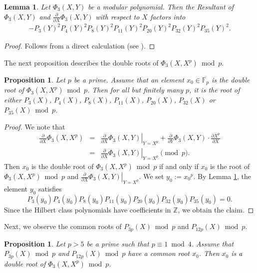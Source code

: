 \documentclass[a4paper, 11pt]{article}
\theoremstyle{plain}
\newtheorem{prop}[defn]{Proposition}
\newtheorem{lem}[defn]{Lemma}
\newcommand{\?}{\textcolor{red}{??}}
\newcommand{\fp}{\mathbb{F}_p}
\newcommand{\bZ}{\mathbb{Z}}
\begin{document}
\begin{lem}
\label{resultantphi3}
    Let ${\Phi}_3(X,Y)$ be a modular polynomial. Then the Resultant of $\Phi_3(X,Y)$ and $\frac{\partial }{\partial X} {\Phi}_3(X,Y)$ with respect to $X$ factors into 
    \begin{eqnarray*}
       -P_3(Y)^2P_4(Y)^2P_8(Y)^2P_{11}(Y)^2P_{20}(Y)^2P_{32}(Y)^2P_{35}(Y)^2.
    \end{eqnarray*}

\end{lem}
\begin{proof}
    Follows from a direct calculation (see \cite[10]{Github}).
\end{proof}
The next proposition describes the double roots of $\Phi_3(X, X^p) \bmod p$.
\begin{prop}
\label{doublerootofphi3}
    Let $p$ be a prime.  Assume that an element $x_0 \in \overline{\fp}$ is the double root of ${\Phi}_3(X, X^p) \bmod p$.  Then for all but finitely many $p$, it is the root of either $P_3(X)$, $P_4(X)$, $P_8(X)$, $P_{11}(X)$, $P_{20}(X)$, $P_{32}(X)$ or $P_{35}(X) \bmod p$.
\end{prop}
\begin{proof}
    We note that 
    \begin{eqnarray*}
         \frac{\partial }{\partial X} {\Phi}_3(X,X^p)&=& \left.  \frac{\partial }{\partial X} {\Phi}_3(X,Y) \right |_{Y=X^p}+ \frac{\partial }{\partial Y} {\Phi}_3(X,Y) \cdot  \frac{\partial X^p}{\partial X}\\ &=& \left.  \frac{\partial }{\partial X} {\Phi}_3(X,Y) \right |_{Y=X^p} \pmod p.
    \end{eqnarray*}
    Then $x_0$ is the double root of ${\Phi}_3(X,X^p) \bmod p$ if and only if $x_0$ is the root of ${\Phi}_3(X,X^p) \bmod p$ and $\left.  \frac{\partial }{\partial X} {\Phi}_3(X,Y) \right |_{Y=X^p}$. We set $y_0:={x_0}^p$. By Lemma \ref{resultantphi3}, the element $y_0$ satisfies 
    \[
    P_3(y_0)P_4(y_0)P_8(y_0)P_{11}(y_0)P_{20}(y_0)P_{32}(y_0)P_{35}(y_0)=0.
    \]
    Since the Hilbert class polynomials have coefficients in $\bZ$, we obtain the claim. 
\end{proof}
Next, we observe the common roots of $P_{3p}(X) \bmod p$ and  $P_{12p}(X) \bmod p$. 
\begin{prop}
\label{commonof3pand12p}
    Let $p>5$ be a prime such that $p \equiv 1 \bmod 4$.  Assume that $P_{3p}(X) \bmod p$ and $P_{12p}(X) \bmod p$ have a common root $\overline{x_0}$. Then $\overline{x_0}$ is \textcolor{black}{a} double root of $\Phi_3(X,X^p) \bmod p$.
\end{prop}
\end{document}
